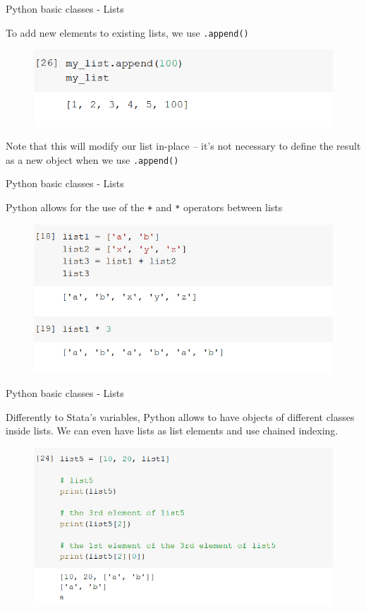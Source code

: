 \documentclass[aspectratio=169]{beamer}
\begin{document}
\begin{frame}{Python basic classes - Lists}

	To add new elements to existing lists, we use \texttt{.append()}

	\begin{figure}
		\centering
		\includegraphics[width=0.6\linewidth]{img/list_append.png}
	\end{figure}

	Note that this will modify our list in-place -- it's not necessary to define the result as a new object when we use \texttt{.append()}

\end{frame}

\begin{frame}{Python basic classes - Lists}

	Python allows for the use of the \texttt{+} and \texttt{*} operators between lists

	\begin{figure}
		\centering
		\includegraphics[width=0.6\linewidth]{img/list_operations.png}
	\end{figure}

\end{frame}

\begin{frame}{Python basic classes - Lists}

	Differently to Stata's variables, Python allows to have objects of different classes inside lists. We can even have lists as list elements and use chained indexing.

	\begin{figure}
		\centering
		\includegraphics[width=0.6\linewidth]{img/list_many_types.png}
	\end{figure}

\end{frame}
\end{document}
